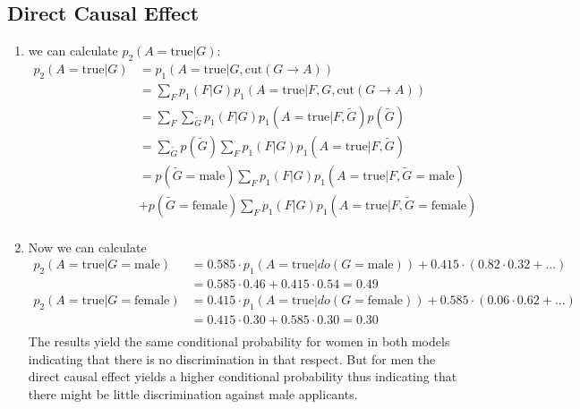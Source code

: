 \documentclass{article}
\begin{document}
\subsection*{Direct Causal Effect}
\begin{enumerate}
	\item we can calculate $p_2(A = \text{true} | G)$: \\
	\begin{align*}
		p_2(A = \text{true} | G) & = p_1(A = \text{true} | G, \text{cut}(G \rightarrow A)) \\
					& = \sum_{F} p_1(F|G)  p_1(A = \text{true} | F, G, \text{cut}(G \rightarrow A)) \\
					& = \sum_{F}\sum_{\tilde{G}} p_1(F|G)  p_1(A = \text{true} | F, \tilde{G}) p(\tilde{G}) \\
					& = \sum_{\tilde{G}} p(\tilde{G}) \sum_{F} p_1(F|G)  p_1(A = \text{true} | F, \tilde{G}) \\
					& = p(\tilde{G} = \text{male})\sum_{F} p_1(F|G)  p_1(A = \text{true} | F, \tilde{G} = \text{male}) \\
					& + p(\tilde{G} = \text{female})\sum_{F} p_1(F|G)  p_1(A = \text{true} | F, \tilde{G} = \text{female})\\
	\end{align*}

	\item Now we can calculate
		\begin{align*}
		p_2(A = \text{true} | G = \text{male}) & =  0.585 \cdot p_1(A = \text{true} | do(G = \text{male})) + 0.415 \cdot (0.82 \cdot 0.32 + ... )\\
							&  = 0.585 \cdot 0.46 + 0.415 \cdot 0.54 = 0.49 \\
		p_2(A = \text{true} | G = \text{female}) & =  0.415 \cdot p_1(A = \text{true} | do(G = \text{female})) + 0.585 \cdot (0.06 \cdot 0.62 + ... )\\
							&  = 0.415 \cdot 0.30 + 0.585 \cdot 0.30 = 0.30 \\
		\end{align*}
	The results yield the same conditional probability for women in both models indicating that there is no discrimination in that respect. But for men the direct causal effect yields a higher conditional probability thus indicating that there might be little discrimination against male applicants.
\end{enumerate}
\end{document}
